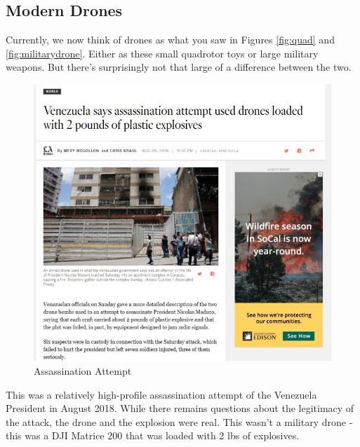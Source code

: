 \documentclass[
]{book}
\theoremstyle{definition}
\theoremstyle{definition}
\theoremstyle{definition}
\theoremstyle{remark}
\begin{document}
\hypertarget{modern-drones}{%
\subsection{Modern Drones}\label{modern-drones}}

Currently, we now think of drones as what you saw in Figures \ref{fig:quad} and \ref{fig:militarydrone}. Either as these small quadrotor toys or large military weapons. But there's surprisingly not that large of a difference between the two.

\begin{figure}

{\centering \includegraphics[width=0.8\linewidth]{images/history/Venezuela1} 

}

\caption{Assassination Attempt}\label{fig:venAssassin}
\end{figure}

This was a relatively high-profile assassination attempt of the Venezuela President in August 2018. While there remains questions about the legitimacy of the attack, the drone and the explosion were real. This wasn't a military drone - this was a DJI Matrice 200 that was loaded with 2 lbs of explosives.
\end{document}
